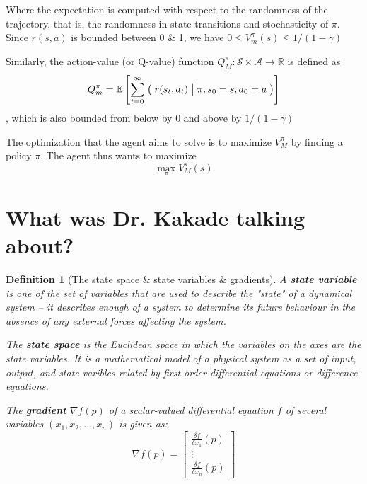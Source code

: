 \documentclass[12pt,reqno]{amsart}
\newtheorem{defn}{Definition}
\newcommand{\Cond}[2]{\bigm( {#1} \bigm\vert {#2}\bigm)}
\newcommand{\E}{\mathbb E}
\begin{document}
Where the expectation is computed with respect to the randomness of the trajectory, that is, the randomness in state-transitions and stochasticity of $\pi$. Since $r(s,a)$ is bounded between 0 \& 1, we have $0 \leq V_{m}^{\pi}(s) \leq 1/(1 - \gamma)$

Similarly, the action-value (or Q-value) function $Q_{M}^{\pi} : \mathcal{S} \times \mathcal{A} \rightarrow \mathbb{R}$ is defined as 
\begin{equation}\label{eqn:Q}
Q_{m}^{\pi} = \E \left[\sum\limits_{t = 0}^{\infty} \Cond{r(s_{t},a_{t})}{\pi, s_{0} = s, a_{0} = a}    \right]
\end{equation}
, which is also bounded from below by 0 and above by $1/(1-\gamma)$

\medskip

The optimization that the agent aims to solve is to maximize $V_{M}^{\pi}$ by finding a policy $\pi$. The agent thus wants to maximize
\begin{equation}\label{eqn:optvalues}
\max\limits_{\pi} V_{M}^{\pi}(s)
\end{equation}

\section{What was Dr. Kakade talking about?}
\begin{shaded}
\begin{defn}[The state space \& state variables \& gradients]
A \textbf{state variable} is one of the set of variables that are used to describe the "state" of a dynamical system -- it describes enough of a system to determine its future behaviour in the absence of any external forces affecting the system.

The \textbf{state space} is the Euclidean space in which the variables on the axes are the state variables. It is a mathematical model of a physical system as a set of input, output,  and state varibles related by first-order differential equations or difference equations.

The \textbf{gradient} $\nabla f(p)$ of a scalar-valued differential equation $f$ of several variables $(x_1,x_2, \ldots, x_n)$ is given as:
\begin{equation}
\nabla f(p) = \begin{bmatrix}
\frac{\delta f}{\delta x_1}(p)\\
\vdots\\
\frac{\delta f}{\delta x_n}(p)
\end{bmatrix}
\end{equation}
\end{defn}
\end{shaded}
\end{document}
